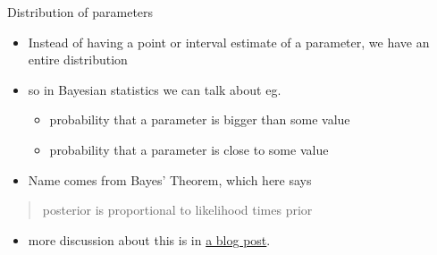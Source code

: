 \documentclass[ignorenonframetext,]{beamer}
\providecommand{\tightlist}{%
  \setlength{\itemsep}{0pt}\setlength{\parskip}{0pt}}
\begin{document}
\begin{frame}{Distribution of parameters}
\protect\hypertarget{distribution-of-parameters}{}

\begin{itemize}
\tightlist
\item
  Instead of having a point or interval estimate of a parameter, we have
  an entire distribution
\item
  so in Bayesian statistics we can talk about eg.

  \begin{itemize}
  \tightlist
  \item
    probability that a parameter is bigger than some value
  \item
    probability that a parameter is close to some value
  \end{itemize}
\item
  Name comes from Bayes' Theorem, which here says
\end{itemize}

\begin{quote}
posterior is proportional to likelihood times prior
\end{quote}

\begin{itemize}
\tightlist
\item
  more discussion about this is in
  \href{http://ritsokiguess.site/docs/2018/02/28/working-my-way-back-to-you-a-re-investigation-of-rstan/}{a
  blog post}.
\end{itemize}

\end{frame}
\end{document}

